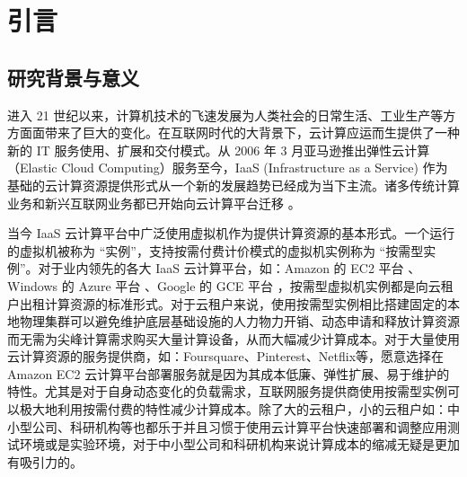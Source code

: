 \chapter{引言}
\label{cha:intro}

\section{研究背景与意义}
进入 21 世纪以来，计算机技术的飞速发展为人类社会的日常生活、工业生产等方方面面带来了巨大的变化。在互联网时代的大背景下，云计算应运而生提供了一种新的 IT 服务使用、扩展和交付模式。从 2006 年 3 月亚马逊推出弹性云计算（Elastic Cloud Computing）服务至今，IaaS (Infrastructure as a Service) 作为基础的云计算资源提供形式从一个新的发展趋势已经成为当下主流。诸多传统计算业务和新兴互联网业务都已开始向云计算平台迁移 \cite{Armbrust:2010:VCC:1721654.1721672}。

当今 IaaS 云计算平台中广泛使用虚拟机作为提供计算资源的基本形式。一个运行的虚拟机被称为 ``实例''，支持按需付费计价模式的虚拟机实例称为 ``按需型实例''。对于业内领先的各大 IaaS 云计算平台，如：Amazon 的 EC2 平台 \cite{AWS}、Windows 的 Azure 平台 \cite{Azure}、Google 的 GCE 平台 \cite{GCE}，按需型虚拟机实例都是向云租户出租计算资源的标准形式。对于云租户来说，使用按需型实例相比搭建固定的本地物理集群可以避免维护底层基础设施的人力物力开销、动态申请和释放计算资源而无需为尖峰计算需求购买大量计算设备，从而大幅减少计算成本。对于大量使用云计算资源的服务提供商，如：Foursquare、Pinterest、Netflix等，愿意选择在 Amazon EC2 云计算平台部署服务就是因为其成本低廉、弹性扩展、易于维护的特性。尤其是对于自身动态变化的负载需求，互联网服务提供商使用按需型实例可以极大地利用按需付费的特性减少计算成本。除了大的云租户，小的云租户如：中小型公司、科研机构等也都乐于并且习惯于使用云计算平台快速部署和调整应用测试环境或是实验环境，对于中小型公司和科研机构来说计算成本的缩减无疑是更加有吸引力的。


